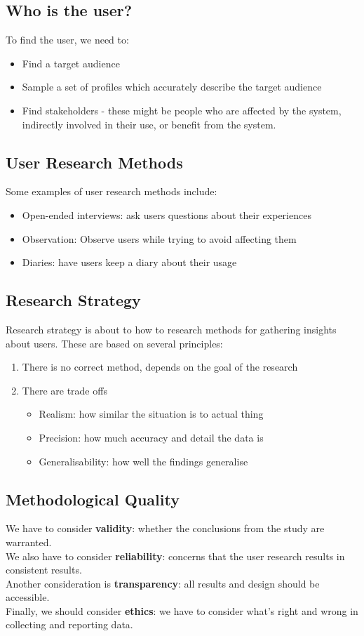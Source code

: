 \documentclass{article}
\begin{document}
\subsection{Who is the user?}
To find the user, we need to:
\begin{itemize}
    \item Find a target audience
    \item Sample a set of profiles which accurately describe the target audience
    \item Find stakeholders - these might be people who are affected by the system, indirectly involved in their use, or benefit from the system.
\end{itemize}
\subsection{User Research Methods}
Some examples of user research methods include:
\begin{itemize}
    \item Open-ended interviews: ask users questions about their experiences
    \item Observation: Observe users while trying to avoid affecting them
    \item Diaries: have users keep a diary about their usage
\end{itemize}
\subsection{Research Strategy}
Research strategy is about to how to research methods for gathering insights about users. These are based on several principles:
\begin{enumerate}
    \item There is no correct method, depends on the goal of the research
    \item There are trade offs
    \begin{itemize}
        \item Realism: how similar the situation is to actual thing
        \item Precision: how much accuracy and detail the data is
        \item Generalisability: how well the findings generalise
    \end{itemize}
\end{enumerate}
\subsection{Methodological Quality}
We have to consider \textbf{validity}: whether the conclusions from the study are warranted.\\  We also have to consider \textbf{reliability}: concerns that the user research results in consistent results. \\
Another consideration is \textbf{transparency}: all results and design should be accessible.\\
Finally, we should consider \textbf{ethics}: we have to consider what's right and wrong in collecting and reporting data.
\end{document}
